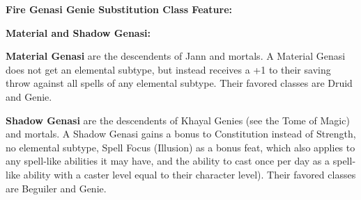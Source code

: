 \textbf{Fire Genasi Genie Substitution Class Feature:}


\textbf{Material and Shadow Genasi:}

\textbf{Material Genasi} are the descendents of Jann and mortals.  A Material Genasi does not get an elemental subtype, but instead receives a +1 to their saving throw against all spells of any elemental subtype.  Their favored classes are Druid and Genie.

\textbf{Shadow Genasi} are the descendents of Khayal Genies (see the Tome of Magic) and mortals.  A Shadow Genasi gains a bonus to Constitution instead of Strength, no elemental subtype, Spell Focus (Illusion) as a bonus feat, which also applies to any spell-like abilities it may have, and the ability to cast  once per day as a spell-like ability with a caster level equal to their character level).  Their favored classes are Beguiler and Genie.